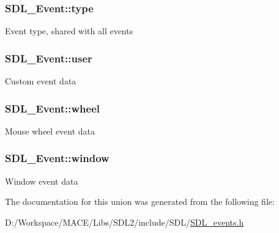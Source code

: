 \subsubsection[{\texorpdfstring{type}{type}}]{ S\+D\+L\+\_\+\+Event\+::type}\hypertarget{union_s_d_l___event_a237648bec242d2d5835f1a4250ddfa46}{}\label{union_s_d_l___event_a237648bec242d2d5835f1a4250ddfa46}
Event type, shared with all events 
\subsubsection[{\texorpdfstring{user}{user}}]{ S\+D\+L\+\_\+\+Event\+::user}\hypertarget{union_s_d_l___event_ab7c394e3ce7bf1e4f8d68bc0e9f1b042}{}\label{union_s_d_l___event_ab7c394e3ce7bf1e4f8d68bc0e9f1b042}
Custom event data 
\subsubsection[{\texorpdfstring{wheel}{wheel}}]{ S\+D\+L\+\_\+\+Event\+::wheel}\hypertarget{union_s_d_l___event_a267d3f550715519ec90a81ccd0e6cbda}{}\label{union_s_d_l___event_a267d3f550715519ec90a81ccd0e6cbda}
Mouse wheel event data 
\subsubsection[{\texorpdfstring{window}{window}}]{ S\+D\+L\+\_\+\+Event\+::window}\hypertarget{union_s_d_l___event_a826936b3275406d857bc6654669fae71}{}\label{union_s_d_l___event_a826936b3275406d857bc6654669fae71}
Window event data 

The documentation for this union was generated from the following file\+:\begin{DoxyCompactItemize}
\item 
D\+:/\+Workspace/\+M\+A\+C\+E/\+Libs/\+S\+D\+L2/include/\+S\+D\+L/\hyperlink{_s_d_l__events_8h}{S\+D\+L\+\_\+events.\+h}\end{DoxyCompactItemize}
